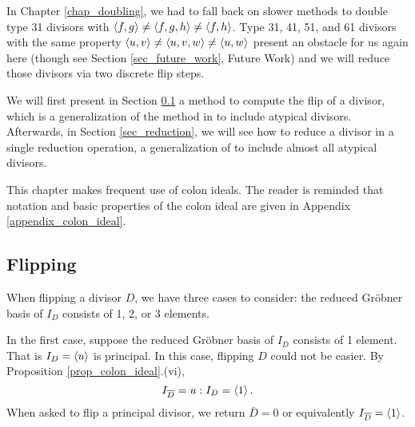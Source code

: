 In Chapter \ref{chap_doubling}, we had to fall back on slower methods
to double type 31 divisors with $\left\langle f,g \right\rangle \neq \left\langle f,g,h \right\rangle \neq \left\langle f,h \right\rangle$.
Type 31, 41, 51, and 61 divisors with the same property $\left\langle u,v \right\rangle \neq \left\langle u,v,w \right\rangle \neq \left\langle u,w \right\rangle$
present an obstacle for us again here (though see Section \ref{sec_future_work}, Future Work)
and we will reduce those divisors via two discrete flip steps.

We will first present in Section \ref{sec_flipping} a method to compute the flip of a divisor,
which is a generalization of the method in \cite{salem07} to include atypical divisors.
Afterwards, in Section \ref{sec_reduction}, we will see how to reduce a divisor in a single reduction operation,
a generalization of \cite{kmakdisi18} to include almost all atypical divisors.

This chapter makes frequent use of colon ideals.
The reader is reminded that notation and basic properties
of the colon ideal are given in Appendix \ref{appendix_colon_ideal}.



\subsection{Flipping}
\label{sec_flipping}

When flipping a divisor $D$, we have three cases to consider:
the reduced Gr\"obner basis of $I_D$ consists of 1, 2, or 3 elements.

In the first case, suppose the reduced Gr\"obner basis of $I_D$ consists of 1 element.
That is $I_D = \left\langle u \right\rangle$ is principal.
In this case, flipping $D$ could not be easier.
By Proposition \ref{prop_colon_ideal}.(vi),
\[ I_{\overline D} = u : I_D = \left\langle 1 \right\rangle. \]
When asked to flip a principal divisor, we return $\bar D = 0$ or equivalently $I_{\overline D} = \left\langle 1 \right\rangle$.

